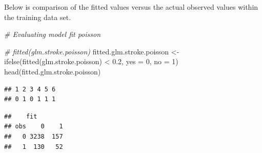 \documentclass[
]{article}
\newenvironment{Shaded}{\begin{snugshade}}{\end{snugshade}}
\newcommand{\AttributeTok}[1]{\textcolor[rgb]{0.77,0.63,0.00}{#1}}
\newcommand{\CommentTok}[1]{\textcolor[rgb]{0.56,0.35,0.01}{\textit{#1}}}
\newcommand{\DecValTok}[1]{\textcolor[rgb]{0.00,0.00,0.81}{#1}}
\newcommand{\FloatTok}[1]{\textcolor[rgb]{0.00,0.00,0.81}{#1}}
\newcommand{\FunctionTok}[1]{\textcolor[rgb]{0.00,0.00,0.00}{#1}}
\newcommand{\NormalTok}[1]{#1}
\newcommand{\OtherTok}[1]{\textcolor[rgb]{0.56,0.35,0.01}{#1}}
\newcommand{\SpecialCharTok}[1]{\textcolor[rgb]{0.00,0.00,0.00}{#1}}
\renewcommand{\=}[1]{\stackrel{#1}{=}}
\theoremstyle{definition}
\theoremstyle{remark}
\begin{document}
Below is comparison of the fitted values versus the actual observed values within the training data set.

\begin{Shaded}
\begin{Highlighting}[]
\CommentTok{\# Evaluating model fit poisson}

\CommentTok{\# fitted(glm.stroke.poisson)}
\NormalTok{fitted.glm.stroke.poisson }\OtherTok{\textless{}{-}} \FunctionTok{ifelse}\NormalTok{(}\FunctionTok{fitted}\NormalTok{(glm.stroke.poisson) }\SpecialCharTok{\textless{}} \FloatTok{0.2}\NormalTok{, }\AttributeTok{yes =} \DecValTok{0}\NormalTok{, }\AttributeTok{no =} \DecValTok{1}\NormalTok{)}
\FunctionTok{head}\NormalTok{(fitted.glm.stroke.poisson)}
\end{Highlighting}
\end{Shaded}

\begin{verbatim}
## 1 2 3 4 5 6 
## 0 1 0 1 1 1
\end{verbatim}

\begin{Shaded}
\end{Shaded}

\begin{verbatim}
##    fit
## obs    0    1
##   0 3238  157
##   1  130   52
\end{verbatim}

\begin{Shaded}
\end{Shaded}
\end{document}
